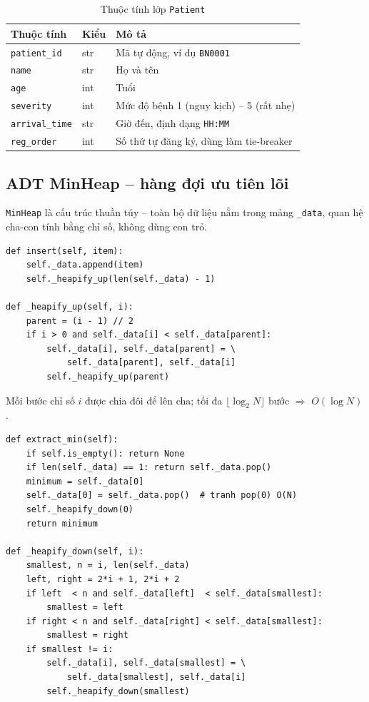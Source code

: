 \documentclass[12pt,a4paper]{report}
\newcommand{\bigO}[1]{$O(#1)$}
\begin{document}
\begin{table}[H]
\centering
\caption{Thuộc tính lớp \texttt{Patient}}
\begin{tabular}{lll}
\toprule
\textbf{Thuộc tính} & \textbf{Kiểu} & \textbf{Mô tả} \\
\midrule
\texttt{patient\_id}   & str & Mã tự động, ví dụ \texttt{BN0001} \\
\texttt{name}          & str & Họ và tên \\
\texttt{age}           & int & Tuổi \\
\texttt{severity}      & int & Mức độ bệnh 1 (nguy kịch) -- 5 (rất nhẹ) \\
\texttt{arrival\_time} & str & Giờ đến, định dạng \texttt{HH:MM} \\
\texttt{reg\_order}    & int & Số thứ tự đăng ký, dùng làm tie-breaker \\
\bottomrule
\end{tabular}
\end{table}

\subsection{ADT MinHeap -- hàng đợi ưu tiên lõi}

\texttt{MinHeap} là cấu trúc thuần túy -- toàn bộ dữ liệu nằm trong mảng
\texttt{\_data}, quan hệ cha-con tính bằng chỉ số, không dùng con trỏ.

\begin{lstlisting}[caption=insert và \_heapify\_up: O(log N) (min\_heap.py)]
def insert(self, item):
    self._data.append(item)
    self._heapify_up(len(self._data) - 1)

def _heapify_up(self, i):
    parent = (i - 1) // 2
    if i > 0 and self._data[i] < self._data[parent]:
        self._data[i], self._data[parent] = \
            self._data[parent], self._data[i]
        self._heapify_up(parent)
\end{lstlisting}

Mỗi bước chỉ số $i$ được chia đôi để lên cha; tối đa $\lfloor\log_2 N\rfloor$
bước $\Rightarrow$ \textbf{\bigO{\log N}}.

\begin{lstlisting}[caption=extract\_min và \_heapify\_down: O(log N) (min\_heap.py)]
def extract_min(self):
    if self.is_empty(): return None
    if len(self._data) == 1: return self._data.pop()
    minimum = self._data[0]
    self._data[0] = self._data.pop()  # tranh pop(0) O(N)
    self._heapify_down(0)
    return minimum

def _heapify_down(self, i):
    smallest, n = i, len(self._data)
    left, right = 2*i + 1, 2*i + 2
    if left  < n and self._data[left]  < self._data[smallest]:
        smallest = left
    if right < n and self._data[right] < self._data[smallest]:
        smallest = right
    if smallest != i:
        self._data[i], self._data[smallest] = \
            self._data[smallest], self._data[i]
        self._heapify_down(smallest)
\end{lstlisting}
\end{document}
